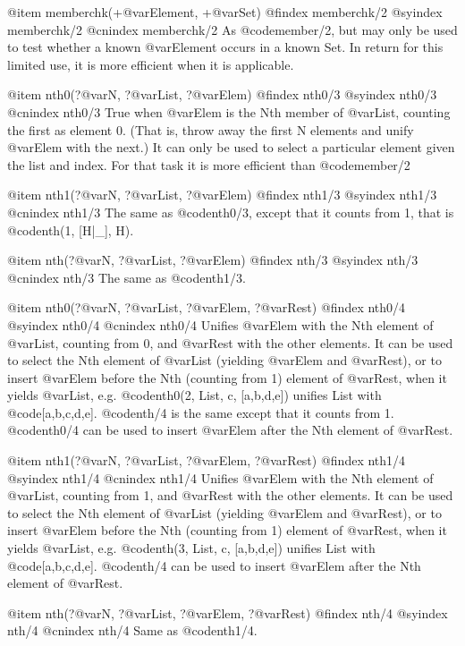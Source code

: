 @item memberchk(+@var{Element}, +@var{Set})
@findex memberchk/2
@syindex memberchk/2
@cnindex memberchk/2
As @code{member/2}, but may only be used to test whether a known
@var{Element} occurs in a known Set.  In return for this limited use, it
is more efficient when it is applicable.

@item nth0(?@var{N}, ?@var{List}, ?@var{Elem})
@findex nth0/3
@syindex nth0/3
@cnindex nth0/3
True when @var{Elem} is the Nth member of @var{List},
counting the first as element 0.  (That is, throw away the first
N elements and unify @var{Elem} with the next.)  It can only be used to
select a particular element given the list and index.  For that
task it is more efficient than @code{member/2}

@item nth1(?@var{N}, ?@var{List}, ?@var{Elem})
@findex nth1/3
@syindex nth1/3
@cnindex nth1/3
The same as @code{nth0/3}, except that it counts from
1, that is @code{nth(1, [H|_], H)}.

@item nth(?@var{N}, ?@var{List}, ?@var{Elem})
@findex nth/3
@syindex nth/3
@cnindex nth/3
The same as @code{nth1/3}.

@item nth0(?@var{N}, ?@var{List}, ?@var{Elem}, ?@var{Rest})
@findex nth0/4
@syindex nth0/4
@cnindex nth0/4
Unifies @var{Elem} with the Nth element of @var{List},
counting from 0, and @var{Rest} with the other elements.  It can be used
to select the Nth element of @var{List} (yielding @var{Elem} and @var{Rest}), or to
insert @var{Elem} before the Nth (counting from 1) element of @var{Rest}, when
it yields @var{List}, e.g. @code{nth0(2, List, c, [a,b,d,e])} unifies List with
@code{[a,b,c,d,e]}.  @code{nth/4} is the same except that it counts from 1.  @code{nth0/4}
can be used to insert @var{Elem} after the Nth element of @var{Rest}.

@item nth1(?@var{N}, ?@var{List}, ?@var{Elem}, ?@var{Rest})
@findex nth1/4
@syindex nth1/4
@cnindex nth1/4
Unifies @var{Elem} with the Nth element of @var{List}, counting from 1,
and @var{Rest} with the other elements.  It can be used to select the
Nth element of @var{List} (yielding @var{Elem} and @var{Rest}), or to
insert @var{Elem} before the Nth (counting from 1) element of
@var{Rest}, when it yields @var{List}, e.g. @code{nth(3, List, c, [a,b,d,e])} unifies List with @code{[a,b,c,d,e]}.  @code{nth/4}
can be used to insert @var{Elem} after the Nth element of @var{Rest}.

@item nth(?@var{N}, ?@var{List}, ?@var{Elem}, ?@var{Rest})
@findex nth/4
@syindex nth/4
@cnindex nth/4
Same as @code{nth1/4}.

